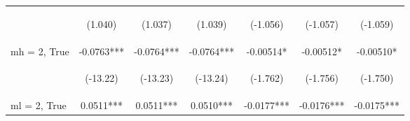 \documentclass[]{article}
\begin{document}
\begin{center}
\begin{tabular}{lcccccc}
        \vspace{4pt}     & \begin{footnotesize}(1.040)\end{footnotesize}  & \begin{footnotesize}(1.037)\end{footnotesize}  & \begin{footnotesize}(1.039)\end{footnotesize}  & \begin{footnotesize}(-1.056)\end{footnotesize} & \begin{footnotesize}(-1.057)\end{footnotesize} & \begin{footnotesize}(-1.059)\end{footnotesize} \\
        mh = 2, True     & -0.0763***                                     & -0.0764***                                     & -0.0764***                                     & -0.00514*                                      & -0.00512*                                      & -0.00510*                                      \\
        \vspace{4pt}     & \begin{footnotesize}(-13.22)\end{footnotesize} & \begin{footnotesize}(-13.23)\end{footnotesize} & \begin{footnotesize}(-13.24)\end{footnotesize} & \begin{footnotesize}(-1.762)\end{footnotesize} & \begin{footnotesize}(-1.756)\end{footnotesize} & \begin{footnotesize}(-1.750)\end{footnotesize} \\
        ml = 2, True     & 0.0511***                                      & 0.0511***                                      & 0.0510***                                      & -0.0177***                                     & -0.0176***                                     & -0.0175***                                     \\

\end{tabular}
\end{center}
\end{document}
